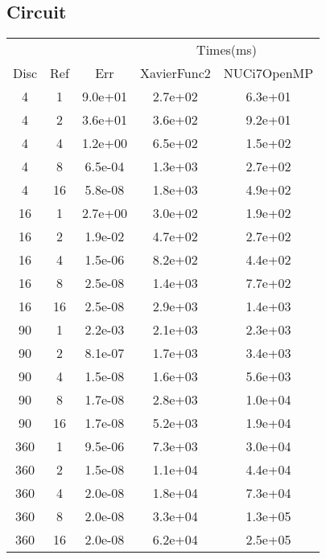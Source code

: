 \subsection{Circuit}
\begin{center}
  \begin{tabular}{c|c|c|c|c}
      &&&\multicolumn{2}{|c}{Times(ms)}\\
    Disc&Ref&Err&XavierFunc2&NUCi7OpenMP\\
    \hline
    4&1&9.0e+01&2.7e+02&6.3e+01\\
    4&2&3.6e+01&3.6e+02&9.2e+01\\
    4&4&1.2e+00&6.5e+02&1.5e+02\\
    4&8&6.5e-04&1.3e+03&2.7e+02\\
    4&16&5.8e-08&1.8e+03&4.9e+02\\
    \hline
    16&1&2.7e+00&3.0e+02&1.9e+02\\
    16&2&1.9e-02&4.7e+02&2.7e+02\\
    16&4&1.5e-06&8.2e+02&4.4e+02\\
    16&8&2.5e-08&1.4e+03&7.7e+02\\
    16&16&2.5e-08&2.9e+03&1.4e+03\\
    \hline
    90&1&2.2e-03&2.1e+03&2.3e+03\\
    90&2&8.1e-07&1.7e+03&3.4e+03\\
    90&4&1.5e-08&1.6e+03&5.6e+03\\
    90&8&1.7e-08&2.8e+03&1.0e+04\\
    90&16&1.7e-08&5.2e+03&1.9e+04\\
    \hline
    360&1&9.5e-06&7.3e+03&3.0e+04\\
    360&2&1.5e-08&1.1e+04&4.4e+04\\
    360&4&2.0e-08&1.8e+04&7.3e+04\\
    360&8&2.0e-08&3.3e+04&1.3e+05\\
    360&16&2.0e-08&6.2e+04&2.5e+05\\
    \hline
  \end{tabular}
\end{center}
